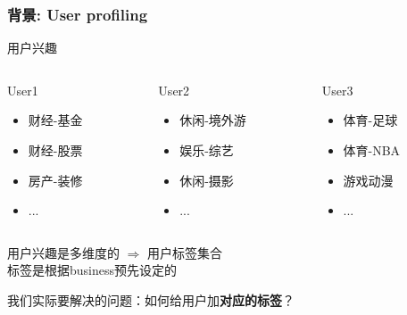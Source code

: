 \documentclass{beamer}
\begin{document}
\begin{frame}
\frametitle{背景: User profiling}
\begin{example}{用户兴趣}
  \begin{columns}

   \pause

    \begin{column}{0.333\textwidth}
      \begin{block}{User1}
      \begin{itemize}
        \item 财经-基金
        \item 财经-股票
        \item 房产-装修
        \item ...
      \end{itemize}
      \end{block}
    \end{column}

    \pause

    \begin{column}{0.333\textwidth}
      \begin{block}{User2}
      \begin{itemize}
        \item 休闲-境外游
        \item 娱乐-综艺
        \item 休闲-摄影
        \item ...
      \end{itemize}
      \end{block}
    \end{column}

    \pause

    \begin{column}{0.333\textwidth}
    \begin{block}{User3}
      \begin{itemize}
        \item 体育-足球
        \item 体育-NBA
        \item 游戏动漫
        \item ...
      \end{itemize}
      \end{block}
    \end{column}
  \end{columns}
\end{example}

\pause

用户兴趣是多维度的 $\Rightarrow$ 用户标签集合 \\
标签是根据business预先设定的 

\pause

\begin{block}{}
我们实际要解决的问题：如何给用户加\textbf{对应的标签}？
\end{block}
\end{frame}
\end{document}
